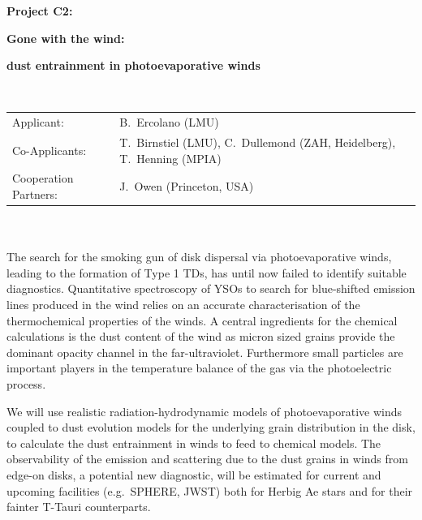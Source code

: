 \documentclass[10pt,fleqn,twoside]{article}
\begin{document}
\newpage


\setcounter{page}{125}

\centerline{\huge\bf\Tcol
%
%
%
%
%
 Project C2:}
\vspace{1em}

\centerline{\LARGE\bf\Tcol Gone with the wind:}\vspace{0.3em}
\centerline{\LARGE\bf\Tcol dust entrainment in photoevaporative winds}

%
%
%
%
%
\vskip1.0cm


\\
\begin{tabular}{ll}
{\textsf{Applicant:}}             & B.~Ercolano (LMU) \\
{\textsf{Co-Applicants:}}         & T.~Birnstiel (LMU), C.~Dullemond (ZAH, Heidelberg), T.~Henning (MPIA)\\
{\textsf{Cooperation Partners:}}  & J.~Owen (Princeton, USA) \\

\end{tabular}


\vspace{1em}
 \\

\vspace{1em}
\\
The search for the smoking gun of disk dispersal via photoevaporative
winds, leading to the formation of Type 1 TDs,  has until
now failed to identify suitable diagnostics. Quantitative spectroscopy of
YSOs to search for blue-shifted emission lines produced in the wind
relies on an accurate characterisation of the thermochemical
properties of the winds. A central ingredients for the chemical
calculations is the dust content of the wind as micron sized grains
provide the dominant opacity channel in the far-ultraviolet.
Furthermore small particles are important players in the temperature
balance of the gas via the photoelectric process.  

We will use realistic radiation-hydrodynamic models of
photoevaporative winds coupled to dust evolution models for the
underlying grain distribution in the disk, to calculate the dust
entrainment in winds to feed to chemical models. The observability of
the emission and scattering due to the dust grains in winds from edge-on
disks, a potential new diagnostic, will be estimated for current and
upcoming facilities (e.g.\ SPHERE, JWST) both for Herbig
Ae stars and for their fainter T-Tauri counterparts.  
\end{document}
